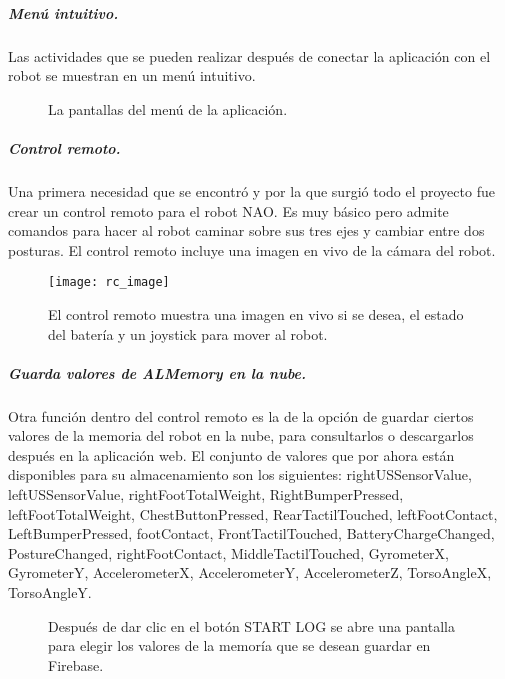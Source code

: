 \subparagraph{Menú intuitivo.}
Las actividades que se pueden realizar después de conectar
la aplicación con el robot se muestran en un menú intuitivo.

\begin{figure}[!h]
    \centering
    \caption{La pantallas del menú de la aplicación.}
    \qquad
    \qquad
    \qquad
\end{figure}



\subparagraph{Control remoto.}
\label{\detokenize{users_docs:control-remoto-para-el-robot}}
Una primera necesidad que se encontró y por la que surgió todo el proyecto
fue crear un control remoto para el robot NAO. Es muy básico pero admite
comandos para hacer al robot caminar sobre sus tres ejes y cambiar entre dos
posturas. El control remoto incluye una imagen en vivo de la
cámara del robot.

\begin{figure}[!h]
    \centering
    \caption{El control remoto muestra una imagen en vivo si se desea, el estado del batería y un joystick para mover al robot.}
\texttt{[image: rc\_image]}

\end{figure}


\subparagraph{Guarda valores de ALMemory en la nube.}
\label{\detokenize{users_docs:guarda-valores-de-almemory-en-la-nube}}
Otra función dentro del control remoto es la de la opción de guardar ciertos
valores de la memoria del robot en la nube, para consultarlos o descargarlos
después en la aplicación web. El conjunto de valores que por ahora
están disponibles para su almacenamiento son los siguientes:
rightUSSensorValue, leftUSSensorValue, rightFootTotalWeight, RightBumperPressed, leftFootTotalWeight, ChestButtonPressed, RearTactilTouched, leftFootContact, LeftBumperPressed, footContact, FrontTactilTouched, BatteryChargeChanged, PostureChanged, rightFootContact, MiddleTactilTouched, GyrometerX, GyrometerY, AccelerometerX, AccelerometerY, AccelerometerZ, TorsoAngleX, TorsoAngleY.

\begin{figure}[!h]
    \centering
    \caption{Después de dar clic en el botón START LOG se abre una pantalla para elegir los valores de la memoría que se desean guardar
    en Firebase.}
    \qquad
\end{figure}


